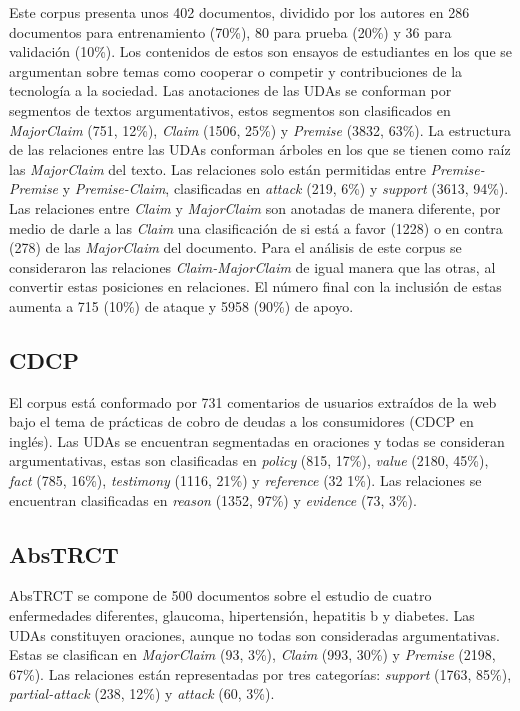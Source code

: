\documentclass[a4paper,11pt,twocolumn,twoside]{article}
\begin{document}
Este corpus \cite{stab2017parsing} presenta unos 402 documentos, dividido por los autores en 286 documentos para entrenamiento (70\%), 
80 para prueba (20\%) y 36 para validación (10\%). Los contenidos de estos son ensayos de estudiantes en los que 
se argumentan sobre temas como cooperar o competir y contribuciones de la tecnología a la sociedad.
Las anotaciones de las UDAs se conforman por segmentos de textos argumentativos, estos segmentos son 
clasificados en \textit{MajorClaim} (751, 12\%), \textit{Claim} (1506, 25\%) y \textit{Premise} (3832, 63\%).
La estructura de las relaciones entre las UDAs conforman árboles en los que se tienen como raíz las 
\textit{MajorClaim} del texto. Las relaciones solo están permitidas entre \textit{Premise-Premise} y \textit{Premise-Claim}, clasificadas
en \textit{attack} (219, 6\%) y \textit{support} (3613, 94\%). Las relaciones entre \textit{Claim} y \textit{MajorClaim} son anotadas 
de manera diferente, por medio de 
darle a las \textit{Claim} una clasificación de si está a favor (1228) o en contra (278) de las \textit{MajorClaim} del documento.
Para el análisis de este corpus se consideraron las relaciones \textit{Claim-MajorClaim} de igual manera que las otras,
al convertir estas posiciones en relaciones. El número final con la inclusión de estas aumenta a 715 (10\%) de ataque y 
5958 (90\%) de apoyo.

\subsection{CDCP}\label{corpus:cdcp}

El corpus \cite{niculae2017argument} está conformado por 731 comentarios de usuarios extraídos de la web bajo el tema de 
prácticas de cobro de deudas a los consumidores (CDCP en inglés).
Las UDAs se encuentran segmentadas en oraciones y todas se consideran argumentativas, estas son clasificadas en 
\textit{policy} (815, 17\%), \textit{value} (2180, 45\%), \textit{fact} (785, 16\%), \textit{testimony} (1116, 21\%) y \textit{reference} (32 1\%). 
Las relaciones se encuentran clasificadas en \textit{reason} (1352, 97\%) y \textit{evidence} (73, 3\%).

\subsection{AbsTRCT}

AbsTRCT \cite{mayer2020transformer} se compone de 500 documentos sobre el estudio de cuatro enfermedades diferentes,
glaucoma, hipertensión, hepatitis b y diabetes. Las UDAs constituyen oraciones, aunque no todas son consideradas
argumentativas. Estas se clasifican en \textit{MajorClaim} (93, 3\%), \textit{Claim} (993, 30\%) y \textit{Premise} (2198, 67\%).
Las relaciones están representadas por tres categorías: \textit{support} (1763, 85\%), \textit{partial-attack} (238, 12\%) y
\textit{attack} (60, 3\%).
\end{document}

